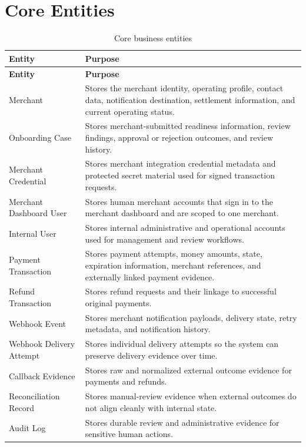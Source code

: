 \section{Core Entities}

\begin{longtable}{L{0.26\textwidth}L{0.64\textwidth}}
\caption{Core business entities}\\
\toprule
\textbf{Entity} & \textbf{Purpose} \\
\midrule
\endfirsthead
\toprule
\textbf{Entity} & \textbf{Purpose} \\
\midrule
\endhead
Merchant & Stores the merchant identity, operating profile, contact data, notification destination, settlement information, and current operating status. \\
\bodyrowrule
Onboarding Case & Stores merchant-submitted readiness information, review findings, approval or rejection outcomes, and review history. \\
\bodyrowrule
Merchant Credential & Stores merchant integration credential metadata and protected secret material used for signed transaction requests. \\
\bodyrowrule
Merchant Dashboard User & Stores human merchant accounts that sign in to the merchant dashboard and are scoped to one merchant. \\
\bodyrowrule
Internal User & Stores internal administrative and operational accounts used for management and review workflows. \\
\bodyrowrule
Payment Transaction & Stores payment attempts, money amounts, state, expiration information, merchant references, and externally linked payment evidence. \\
\bodyrowrule
Refund Transaction & Stores refund requests and their linkage to successful original payments. \\
\bodyrowrule
Webhook Event & Stores merchant notification payloads, delivery state, retry metadata, and notification history. \\
\bodyrowrule
Webhook Delivery Attempt & Stores individual delivery attempts so the system can preserve delivery evidence over time. \\
\bodyrowrule
Callback Evidence & Stores raw and normalized external outcome evidence for payments and refunds. \\
\bodyrowrule
Reconciliation Record & Stores manual-review evidence when external outcomes do not align cleanly with internal state. \\
\bodyrowrule
Audit Log & Stores durable review and administrative evidence for sensitive human actions. \\
\bottomrule
\end{longtable}


